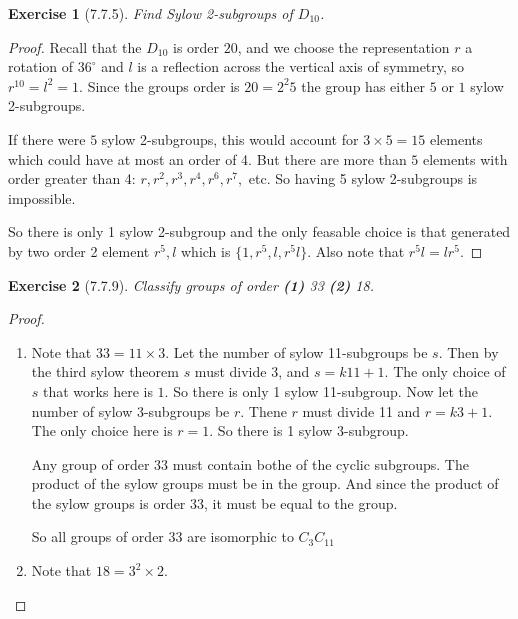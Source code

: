 \documentclass[12pt]{article}
\newtheorem*{exer}{Exercise}
\begin{document}

\begin{exer}[7.7.5]

    Find Sylow 2-subgroups of $D_{10}$.

\end{exer}

\begin{proof}

    Recall that the $D_{10}$ is order $20$, and we choose the
    representation $r$ a rotation of $36^\circ$ and $l$ is a reflection
    across the vertical axis of symmetry, so $r^{10} = l^2 = 1$. Since
    the groups order is $20 = 2^2 5$ the group has either $5$ or $1$
    sylow 2-subgroups.

    If there were $5$ sylow 2-subgroups, this would account for $3
    \times 5 = 15$ elements which could have at most an order of 4. But
    there are more than $5$ elements with order greater than 4: $r, r^2,
    r^3, r^4, r^6, r^7,$ etc. So having 5 sylow 2-subgroups is
    impossible.

    So there is only 1 sylow 2-subgroup and the only feasable choice is
    that generated by two order 2 element $r^5, l$ which is $\{1, r^5,
    l, r^5l\}$. Also note that $r^5 l = l r^5$.

    

\end{proof}


\begin{exer}[7.7.9]

    Classify groups of order \textbf{(1)} 33 \textbf{(2)} 18.

\end{exer}

\begin{proof}

    \begin{enumerate}
        \item Note that $33 = 11 \times 3$. Let the number of sylow
            11-subgroups be $s$. Then by the third sylow theorem $s$
            must divide 3, and $s = k11 + 1$. The only choice of $s$
            that works here is $1$. So there is only 1 sylow
            11-subgroup. Now let the number of sylow 3-subgroups be $r$.
            Thene $r$ must divide 11 and $r = k3 + 1$. The only choice
            here is $r = 1$. So there is 1 sylow 3-subgroup.

            Any group of order 33 must contain bothe of the cyclic
            subgroups. The product of the sylow groups must be in the
            group. And since the product of the sylow groups is order
            33, it must be equal to the group. 

            So all groups of order 33 are isomorphic to $C_{3} C_{11}$

        \item Note that $18 = 3^2 \times 2$.

    \end{enumerate}

\end{proof}
\end{document}
